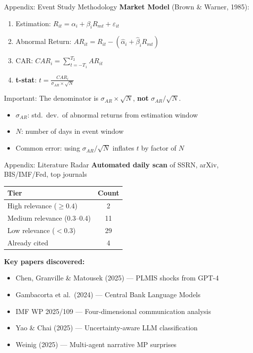 \documentclass[aspectratio=169, 11pt]{beamer}
\begin{document}
\begin{frame}{Appendix: Event Study Methodology}
\textbf{Market Model} (Brown \& Warner, 1985):
\begin{enumerate}
  \item Estimation: $R_{it} = \alpha_i + \beta_i R_{mt} + \varepsilon_{it}$
  \item Abnormal Return: $AR_{it} = R_{it} - (\hat{\alpha}_i + \hat{\beta}_i R_{mt})$
  \item CAR: $CAR_i = \sum_{t=-T_1}^{T_2} AR_{it}$
  \item \textbf{t-stat}: $\displaystyle t = \frac{CAR_i}{\sigma_{AR} \times \sqrt{N}}$
\end{enumerate}

\vspace{0.5em}
\alert{Important:} The denominator is $\sigma_{AR} \times \sqrt{N}$, \textbf{not} $\sigma_{AR} / \sqrt{N}$.

\vspace{0.3em}
\begin{itemize}
  \item $\sigma_{AR}$: std.\ dev.\ of abnormal returns from estimation window
  \item $N$: number of days in event window
  \item Common error: using $\sigma_{AR}/\sqrt{N}$ inflates $t$ by factor of $N$
\end{itemize}
\end{frame}

\begin{frame}{Appendix: Literature Radar}
\textbf{Automated daily scan} of SSRN, arXiv, BIS/IMF/Fed, top journals

\vspace{0.5em}
\begin{tabular}{lc}
\toprule
Tier & Count \\
\midrule
High relevance ($\geq 0.4$) & 2 \\
Medium relevance (0.3--0.4) & 11 \\
Low relevance ($< 0.3$) & 29 \\
Already cited & 4 \\
\bottomrule
\end{tabular}

\vspace{0.5em}
\textbf{Key papers discovered:}
\begin{itemize}
  \item Chen, Granville \& Matousek (2025) --- PLMIS shocks from GPT-4
  \item Gambacorta et al.\ (2024) --- Central Bank Language Models
  \item IMF WP 2025/109 --- Four-dimensional communication analysis
  \item Yao \& Chai (2025) --- Uncertainty-aware LLM classification
  \item Weinig (2025) --- Multi-agent narrative MP surprises
\end{itemize}
\end{frame}
\end{document}
